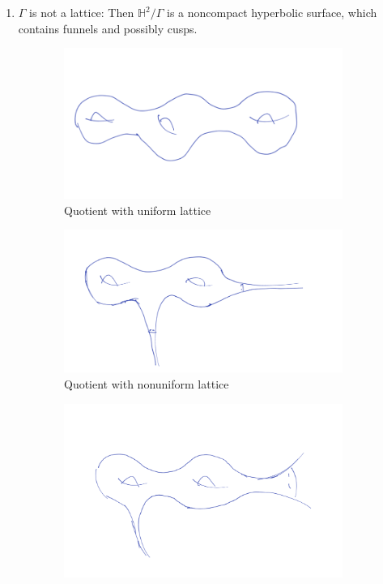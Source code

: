 \documentclass{report}
\begin{document}
\begin{itemize}
\begin{enumerate}[label=(\roman*)]
        \item $\Gamma$ is not a lattice: Then $\mathbb H^2 / \Gamma$ is a noncompact hyperbolic surface, which contains funnels and possibly cusps.
    \end{enumerate}
    \begin{figure}[ht]
        \centering
        \begin{subfigure}[b]{0.3\textwidth}
            \includegraphics[width=\textwidth]{figures/uniform_lattice.png}
            \caption{Quotient with uniform lattice}
            \label{fig:uniform_lattice}
        \end{subfigure}
        \hfill
        \begin{subfigure}[b]{0.3\textwidth}
            \includegraphics[width=\textwidth]{figures/non_uniform_lattice.png}
            \caption{Quotient with nonuniform lattice}
            \label{fig:nonuniform_lattice}
        \end{subfigure}
        \hfill
        \begin{subfigure}[b]{0.3\textwidth}
            \includegraphics[width=\textwidth]{figures/non_lattice.png}

\end{subfigure}
\end{figure}
\end{itemize}
\end{document}
